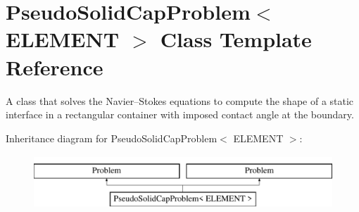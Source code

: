 \hypertarget{classPseudoSolidCapProblem}{}\section{Pseudo\+Solid\+Cap\+Problem$<$ E\+L\+E\+M\+E\+NT $>$ Class Template Reference}
\label{classPseudoSolidCapProblem}


A class that solves the Navier--Stokes equations to compute the shape of a static interface in a rectangular container with imposed contact angle at the boundary.  


Inheritance diagram for Pseudo\+Solid\+Cap\+Problem$<$ E\+L\+E\+M\+E\+NT $>$\+:\begin{figure}[H]
\begin{center}
\leavevmode
\includegraphics[height=2.000000cm]{classPseudoSolidCapProblem}
\end{center}
\end{figure}
